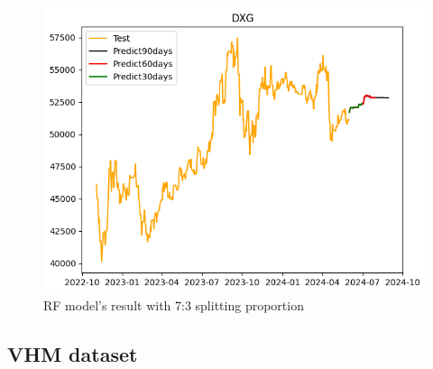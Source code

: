\documentclass{ieeeojies}
\begin{document}
\begin{figure}[H]
  \centering
  \begin{minipage}{0.8\linewidth}
    \centering
        \includegraphics[width=\linewidth]{bibliography/Figure/RF_7-3.png}
    \caption{RF model’s result with 7:3 splitting proportion}
    \label{fig28}
  \end{minipage}
\end{figure}

\subsection{VHM dataset} 
\end{document}
